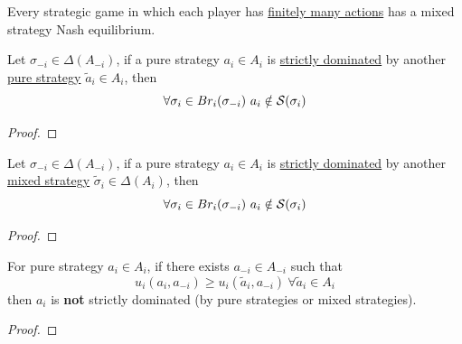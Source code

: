 \documentclass[11pt]{article}
\begin{document}
		\begin{proposition}[Nash]
			Every strategic game in which each player has \ul{finitely many actions} has a mixed strategy Nash equilibrium.
		\end{proposition}
		\begin{proposition}
			Let $\sigma_{-i} \in \Delta(A_{-i})$, if a pure strategy $a_i \in A_i$ is \ul{strictly dominated} by another \ul{pure strategy} $\tilde{a}_i \in A_i$, then
			\begin{equation}
				\forall \sigma_{i} \in Br_i(\sigma_{-i})\ a_i \notin \mathcal{{S}}(\sigma_i)
			\end{equation}
			\begin{proof}
				
			\end{proof}
		\end{proposition}
		
		\begin{proposition}
			Let $\sigma_{-i} \in \Delta(A_{-i})$, if a pure strategy $a_i \in A_i$ is \ul{strictly dominated} by another \ul{mixed strategy} $\tilde{\sigma}_i \in \Delta(A_i)$, then
			\begin{equation}
				\forall \sigma_{i} \in Br_i(\sigma_{-i})\ a_i \notin \mathcal{{S}}(\sigma_i)
			\end{equation}
			\begin{proof}
				
			\end{proof}
		\end{proposition}
		
		\begin{proposition}
			For pure strategy $a_i \in A_i$, if there exists $a_{-i} \in A_{-i}$ such that
			\begin{equation}
				u_i(a_i, a_{-i}) \geq u_i(\tilde{a}_i, a_{-i})\ \forall \tilde{a}_i \in A_i
			\end{equation}
			then $a_i$ is \textbf{not} strictly dominated (by pure strategies or mixed strategies).
			\begin{proof}
				
			\end{proof}
		\end{proposition}
		
\end{document}
